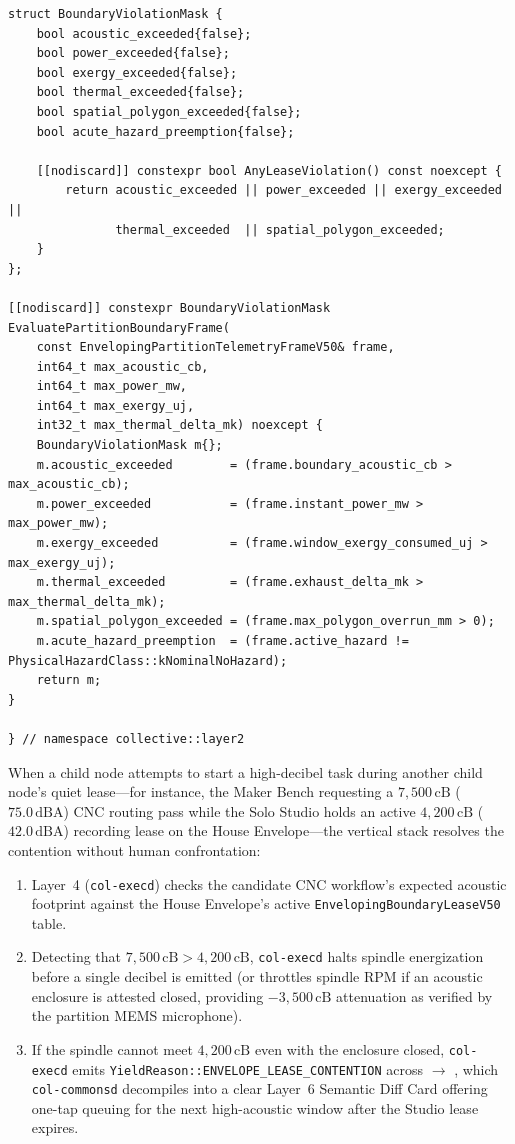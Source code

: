 \begin{lstlisting}
struct BoundaryViolationMask {
    bool acoustic_exceeded{false};
    bool power_exceeded{false};
    bool exergy_exceeded{false};
    bool thermal_exceeded{false};
    bool spatial_polygon_exceeded{false};
    bool acute_hazard_preemption{false};

    [[nodiscard]] constexpr bool AnyLeaseViolation() const noexcept {
        return acoustic_exceeded || power_exceeded || exergy_exceeded ||
               thermal_exceeded  || spatial_polygon_exceeded;
    }
};

[[nodiscard]] constexpr BoundaryViolationMask EvaluatePartitionBoundaryFrame(
    const EnvelopingPartitionTelemetryFrameV50& frame,
    int64_t max_acoustic_cb,
    int64_t max_power_mw,
    int64_t max_exergy_uj,
    int32_t max_thermal_delta_mk) noexcept {
    BoundaryViolationMask m{};
    m.acoustic_exceeded        = (frame.boundary_acoustic_cb > max_acoustic_cb);
    m.power_exceeded           = (frame.instant_power_mw > max_power_mw);
    m.exergy_exceeded          = (frame.window_exergy_consumed_uj > max_exergy_uj);
    m.thermal_exceeded         = (frame.exhaust_delta_mk > max_thermal_delta_mk);
    m.spatial_polygon_exceeded = (frame.max_polygon_overrun_mm > 0);
    m.acute_hazard_preemption  = (frame.active_hazard != PhysicalHazardClass::kNominalNoHazard);
    return m;
}

} // namespace collective::layer2
\end{lstlisting}

When a child node attempts to start a high-decibel task during another child node's quiet lease---for instance, the Maker Bench requesting a $7{,}500\,\mathrm{cB}$ ($75.0\,\mathrm{dBA}$) CNC routing pass while the Solo Studio holds an active $4{,}200\,\mathrm{cB}$ ($42.0\,\mathrm{dBA}$) recording lease on the House Envelope---the vertical stack resolves the contention without human confrontation:
\begin{enumerate}
    \item Layer~4 (\texttt{col-execd}) checks the candidate CNC workflow's expected acoustic footprint against the House Envelope's active \texttt{EnvelopingBoundaryLeaseV50} table.
    \item Detecting that $7{,}500\,\mathrm{cB} > 4{,}200\,\mathrm{cB}$, \texttt{col-execd} halts spindle energization before a single decibel is emitted (or throttles spindle RPM if an acoustic enclosure is attested closed, providing $-3{,}500\,\mathrm{cB}$ attenuation as verified by the partition MEMS microphone).
    \item If the spindle cannot meet $4{,}200\,\mathrm{cB}$ even with the enclosure closed, \texttt{col-execd} emits \texttt{YieldReason::ENVELOPE\_LEASE\_CONTENTION} across  $\to$ , which \texttt{col-commonsd} decompiles into a clear Layer~6 Semantic Diff Card offering one-tap queuing for the next high-acoustic window after the Studio lease expires.
\end{enumerate}

